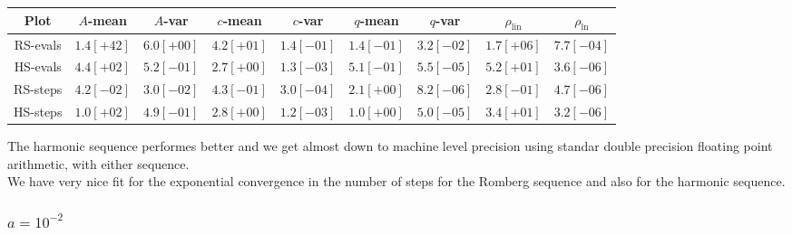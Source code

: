 \begin{table}[H]
    \centering
    \small
    \begin{tabular}{c||c|c|c|c|c|c|c|c}
Plot & \(A\)-mean & \(A\)-var & \(c\)-mean & \(c\)-var & \(q\)-mean & \(q\)-var & \(\rho_{\operatorname{lin}}\) & \(\rho_{\ln}\)\\\hline
\rowcolor{red}
RS-evals & \(1.4[+42]\) & \(6.0[+00]\) & \(4.2[+01]\) & \(1.4[-01]\) & \(1.4[-01]\) & \(3.2[-02]\) & \(1.7[+06]\) & \(7.7[-04]\) \\
\rowcolor{green}
HS-evals & \(4.4[+02]\) & \(5.2[-01]\) & \(2.7[+00]\) & \(1.3[-03]\) & \(5.1[-01]\) & \(5.5[-05]\) & \(5.2[+01]\) & \(3.6[-06]\) \\
\rowcolor{green}
RS-steps & \(4.2[-02]\) & \(3.0[-02]\) & \(4.3[-01]\) & \(3.0[-04]\) & \(2.1[+00]\) & \(8.2[-06]\) & \(2.8[-01]\) & \(4.7[-06]\) \\
\rowcolor{green}
HS-steps & \(1.0[+02]\) & \(4.9[-01]\) & \(2.8[+00]\) & \(1.2[-03]\) & \(1.0[+00]\) & \(5.0[-05]\) & \(3.4[+01]\) & \(3.2[-06]\) \\
    \end{tabular}
    \label{tab:my_label}
\end{table}

The harmonic sequence performes better and we get almost down to machine level precision using standar double precision floating point arithmetic, with either sequence.\\

We have very nice fit for the exponential convergence in the number of steps for the Romberg sequence and also for the harmonic sequence.

\subsubsection{\(a = 10^{-2}\)}


